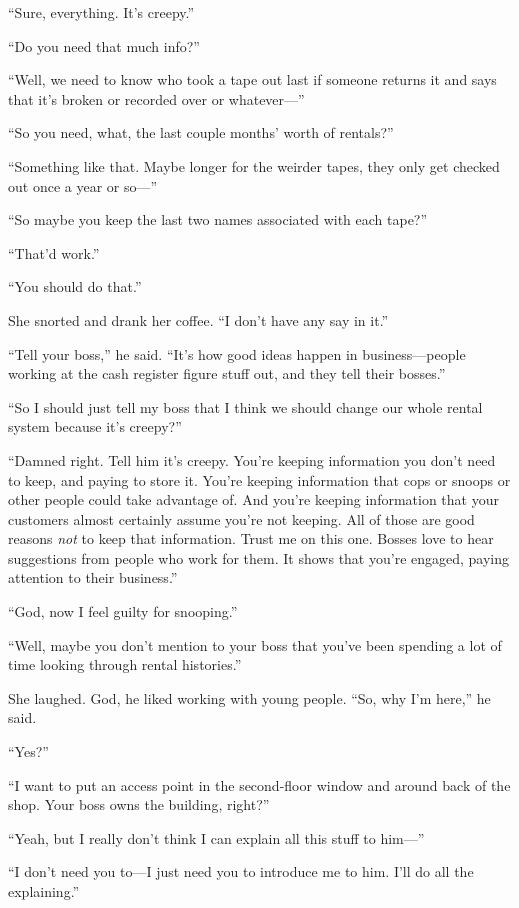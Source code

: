 ``Sure, everything.  It's creepy.''

``Do you need that much info?''

``Well, we need to know who took a tape out last if someone returns it
and says that it's broken or recorded over or whatever---''

``So you need, what, the last couple months' worth of rentals?''

``Something like that.  Maybe longer for the weirder tapes, they only
get checked out once a year or so---''

``So maybe you keep the last two names associated with each tape?''

``That'd work.''

``You should do that.''

She snorted and drank her coffee.  ``I don't have any say in it.''

``Tell your boss,'' he said.  ``It's how good ideas happen in
business---people working at the cash register figure stuff out, and
they tell their bosses.''

``So I should just tell my boss that I think we should change our
whole rental system because it's creepy?''

``Damned right.  Tell him it's creepy.  You're keeping information you
don't need to keep, and paying to store it.  You're keeping
information that cops or snoops or other people could take advantage
of.  And you're keeping information that your customers almost
certainly assume you're not keeping.  All of those are good reasons
\textit{not} to keep that information.  Trust me on this one.  Bosses
love to hear suggestions from people who work for them.  It shows that
you're engaged, paying attention to their business.''

``God, now I feel guilty for snooping.''

``Well, maybe you don't mention to your boss that you've been spending
a lot of time looking through rental histories.''

She laughed.  God, he liked working with young people.  ``So, why I'm
here,'' he said.

``Yes?''

``I want to put an access point in the second-floor window and around
back of the shop.  Your boss owns the building, right?''

``Yeah, but I really don't think I can explain all this stuff to
him---''

``I don't need you to---I just need you to introduce me to him.  I'll
do all the explaining.''

